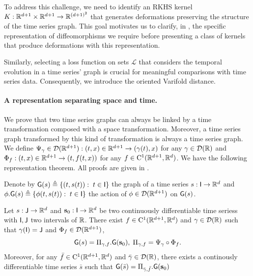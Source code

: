 To address this challenge, we need to identify an RKHS kernel $K:\mathbb{R}^{d+1}\times \mathbb{R}^{d+1}\to \mathbb{R}^{(d+1)^2}$ that generates deformations preserving the structure of the time series graph. This goal motivates us to clarify, in , the specific representation of diffeomorphisms we require before presenting a class of kernels that produce deformations with this representation.
       
Similarly, selecting a loss function on sets $\mathscr{L}$ that considers the temporal evolution in a time series' graph is crucial for meaningful comparisons with time series data. Consequently, we introduce the oriented Varifold distance. 

\vspace{-1ex}
\paragraph{A representation separating space and time.}
We prove that two time series graphs can always be linked by a time transformation composed with a space transformation. Moreover, a time series graph transformed by this kind of transformation is always a time series graph. We define $\Psi_\gamma\in \mathcal{D}(\mathbb{R}^{d+1}) : (t,x)\in\mathbb{R}^{d+1}\to (\gamma(t),x)$ for any $\gamma\in \mathcal{D}(\mathbb{R})$ and $\Phi_f:  (t,x)\in\mathbb{R}^{d+1}\to (t,f(t,x)) $ for any $f\in \mathrm{C}^1(\mathbb{R}^{d+1},\mathbb{R}^d)$. We have the following representation theorem. All proofs are given in . 

Denote by $\mathsf{G}(s)\triangleq \{ (t,s(t)): \; t\in \mathsf{I} \} $ the graph of a time series $s: \mathsf{I} \to \mathbb{R}^d$ and $ \phi.\mathsf{G}(s)\triangleq\{ \phi(t,s(t)): \; t\in \mathsf{I}\} $ the action of  $\phi\in \mathcal{D}(\mathbb{R}^{d+1}) $ on $\mathsf{G}(s)$.
\begin{theorem}
    \label{theorem:representation}
    Let $s:  \mathsf{J} \to \mathbb{R}^d  $ and $\mathbf{s}_0: \mathsf{I}\to \mathbb{R}^d $ be two continuously differentiable time seriess with $\mathsf{I},\mathsf{J}$ two intervals of $\mathbb{R}$.
    There exist $f\in \mathrm{C}^1(\mathbb{R}^{d+1},\mathbb{R}^d)$ and $\gamma\in  \mathcal{D}(\mathbb{R}) $ such that $\gamma(\mathsf{I})=\mathsf{J} $ and $\Phi_f\in \mathcal{D}(\mathbb{R}^{d+1})$,
    \begin{equation}
      \mathsf{G}(s)= \Pi_{\gamma,f}.\mathsf{G}(\mathbf{s}_0),\; \Pi_{\gamma,f}=\Psi_\gamma\circ\Phi_f.
    \end{equation}
    Moreover, for any $\bar{f}\in \mathrm{C}^1(\mathbb{R}^{d+1},\mathbb{R}^d)$ and $\bar{\gamma}\in  \mathcal{D}(\mathbb{R}) $, there exists a continously differentiable time series $\bar{s}$ such that $\mathsf{G}(\bar{s})= \Pi_{\bar{\gamma},\bar{f}}.\mathsf{G}(\mathbf{s}_0)$
\end{theorem}

